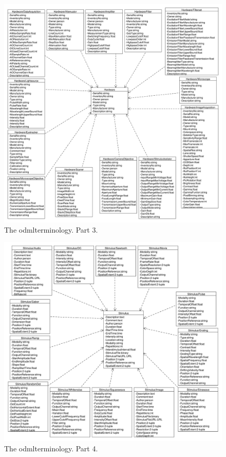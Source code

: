 \documentclass{diplomka}
\begin{document}
\begin{figure}[h]
	\begin{center}
		\includegraphics[scale=0.35]{obrazky/odml2.pdf}
		\caption{The \gls{odml}terminology. Part 3.}
		\label{meta_scheme3}
	\end{center}		
\end{figure}
\begin{figure}[h]
	\begin{center}		
		\includegraphics[scale=0.35]{obrazky/odml3.pdf}
		\caption{The \gls{odml}terminology. Part 4.}
		\label{meta_scheme4}
	\end{center}
\end{figure}
\end{document}
